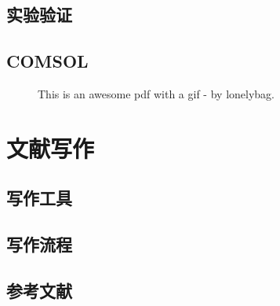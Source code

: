 \documentclass[UTF8]{ctexbook}
\begin{document}
\subsection{实验验证}

\subsection{COMSOL}

\begin{figure}[!htb]
	\centering
	\vspace{-0.3cm}
	\caption{This is an awesome pdf with a gif - by lonelybag.}\label{fig:39}
\end{figure}

\section{文献写作}
\subsection{写作工具}
\subsection{写作流程}
\subsection{参考文献}
\end{document}
